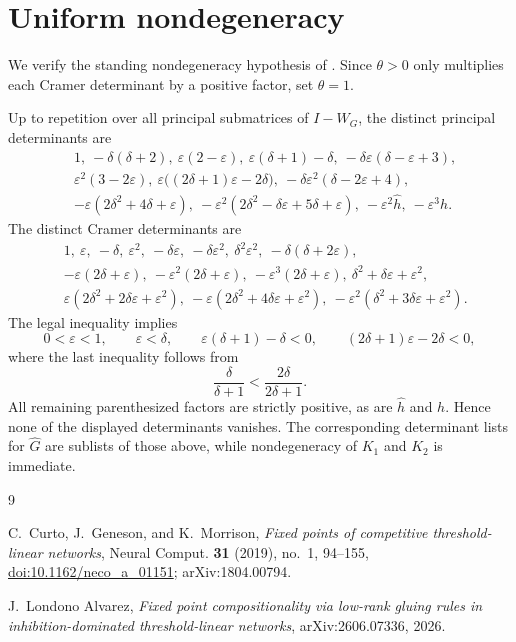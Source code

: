 \documentclass[11pt]{amsart}
\newcommand{\eps}{\varepsilon}
\begin{document}
\appendix

\section{Uniform nondegeneracy}\label{app:nondeg}

We verify the standing nondegeneracy hypothesis of
\cite[Definition~2.3]{CGM}. Since $\theta>0$ only multiplies each Cramer
determinant by a positive factor, set $\theta=1$.

Up to repetition over all principal submatrices of $I-W_G$, the distinct
principal determinants are
\begin{align*}
&1,
\ -\delta(\delta+2),
\ \eps(2-\eps),
\ \eps(\delta+1)-\delta,
\ -\delta\eps(\delta-\eps+3),\\
&\eps^2(3-2\eps),
\ \eps\bigl((2\delta+1)\eps-2\delta\bigr),
\ -\delta\eps^2(\delta-2\eps+4),\\
&-\eps(2\delta^2+4\delta+\eps),
\ -\eps^2(2\delta^2-\delta\eps+5\delta+\eps),
\ -\eps^2\widehat h,
\ -\eps^3h.
\end{align*}
The distinct Cramer determinants are
\begin{align*}
&1,
\ \eps,
\ -\delta,
\ \eps^2,
\ -\delta\eps,
\ -\delta\eps^2,
\ \delta^2\eps^2,
\ -\delta(\delta+2\eps),\\
&-\eps(2\delta+\eps),
\ -\eps^2(2\delta+\eps),
\ -\eps^3(2\delta+\eps),
\ \delta^2+\delta\eps+\eps^2,\\
&\eps(2\delta^2+2\delta\eps+\eps^2),
\ -\eps(2\delta^2+4\delta\eps+\eps^2),
\ -\eps^2(\delta^2+3\delta\eps+\eps^2).
\end{align*}
The legal inequality implies
\[
0<\eps<1,
\qquad
\eps<\delta,
\qquad
\eps(\delta+1)-\delta<0,
\qquad
(2\delta+1)\eps-2\delta<0,
\]
where the last inequality follows from
\[
\frac{\delta}{\delta+1}<\frac{2\delta}{2\delta+1}.
\]
All remaining parenthesized factors are strictly positive, as are
$\widehat h$ and $h$. Hence none of the displayed determinants vanishes.
The corresponding determinant lists for $\widehat G$ are sublists of
those above, while nondegeneracy of $K_1$ and $K_2$ is immediate.

\begin{thebibliography}{9}

C.~Curto, J.~Geneson, and K.~Morrison,
\emph{Fixed points of competitive threshold-linear networks},
Neural Comput. \textbf{31} (2019), no.~1, 94--155,
\href{https://doi.org/10.1162/neco_a_01151}
{doi:10.1162/neco\_a\_01151};
arXiv:1804.00794.

J.~Londono Alvarez,
\emph{Fixed point compositionality via low-rank gluing rules in
inhibition-dominated threshold-linear networks},
arXiv:2606.07336, 2026.

\end{thebibliography}
\end{document}
